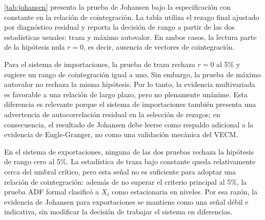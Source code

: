\documentclass[11pt,a4paper]{article}
\begin{document}
	\autoref{tab:johansen} presenta la prueba de Johansen bajo la especificación
	con constante en la relación de cointegración. La tabla utiliza el rezago final
	ajustado por diagnóstico residual y reporta la decisión de rango a partir de
	las dos estadísticas usuales: traza y máximo autovalor. En ambos casos, la
	lectura parte de la hipótesis nula \(r=0\), es decir, ausencia de vectores de
	cointegración.
	
	\begin{table}[H]
		\centering
		\caption{Pruebas de cointegración de Johansen: especificación con constante.}
		\label{tab:johansen}
		\small
		\caption*{\footnotesize Nota: el asterisco indica rechazo al 5\% de la hipótesis
			nula \(r=0\). Los valores críticos al 5\% son 34.91 para la prueba de traza y
			22.00 para la prueba de máximo autovalor bajo la especificación utilizada.}
	\end{table}
	
	Para el sistema de importaciones, la prueba de traza rechaza \(r=0\) al 5\%
	y sugiere un rango de cointegración igual a uno. Sin embargo, la prueba de
	máximo autovalor no rechaza la misma hipótesis. Por lo tanto, la evidencia
	multivariada es favorable a una relación de largo plazo, pero no plenamente
	unánime. Esta diferencia es relevante porque el sistema de importaciones
	también presenta una advertencia de autocorrelación residual en la selección de
	rezagos; en consecuencia, el resultado de Johansen debe leerse como respaldo
	adicional a la evidencia de Engle-Granger, no como una validación mecánica del
	VECM.
	
	En el sistema de exportaciones, ninguna de las dos pruebas rechaza la hipótesis
	de rango cero al 5\%. La estadística de traza bajo constante queda relativamente
	cerca del umbral crítico, pero esta señal no es suficiente para adoptar una
	relación de cointegración: además de no superar el criterio principal al 5\%,
	la prueba ADF formal clasificó a \(X_t\) como estacionaria en niveles. Por esa
	razón, la evidencia de Johansen para exportaciones se mantiene como una señal
	débil e indicativa, sin modificar la decisión de trabajar el sistema en
	diferencias.
	
\end{document}
